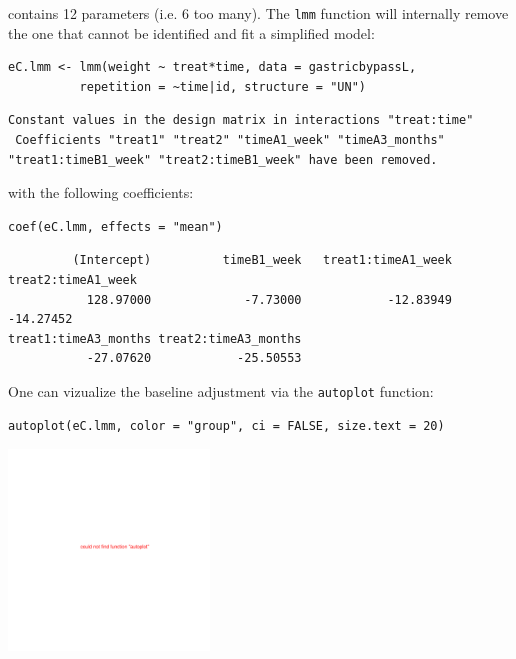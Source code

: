 \documentclass[12pt]{article}
\begin{document}
contains 12 parameters (i.e. 6 too many). The \texttt{lmm} function will
internally remove the one that cannot be identified and fit a
simplified model:
\lstset{language=r,label= ,caption= ,captionpos=b,numbers=none}
\begin{lstlisting}
eC.lmm <- lmm(weight ~ treat*time, data = gastricbypassL,
	      repetition = ~time|id, structure = "UN")
\end{lstlisting}

\begin{verbatim}
Constant values in the design matrix in interactions "treat:time"
 Coefficients "treat1" "treat2" "timeA1_week" "timeA3_months" "treat1:timeB1_week" "treat2:timeB1_week" have been removed.
\end{verbatim}


with the following coefficients:
\lstset{language=r,label= ,caption= ,captionpos=b,numbers=none}
\begin{lstlisting}
coef(eC.lmm, effects = "mean")
\end{lstlisting}

\begin{verbatim}
         (Intercept)          timeB1_week   treat1:timeA1_week   treat2:timeA1_week 
           128.97000             -7.73000            -12.83949            -14.27452 
treat1:timeA3_months treat2:timeA3_months 
           -27.07620            -25.50553
\end{verbatim}


One can vizualize the baseline adjustment via the \texttt{autoplot} function:
\lstset{language=r,label= ,caption= ,captionpos=b,numbers=none}
\begin{lstlisting}
autoplot(eC.lmm, color = "group", ci = FALSE, size.text = 20)
\end{lstlisting}

\begin{center}
\includegraphics[width=0.4\textwidth]{./figures/gg-baseAdj.pdf}
\end{center}
\end{document}
